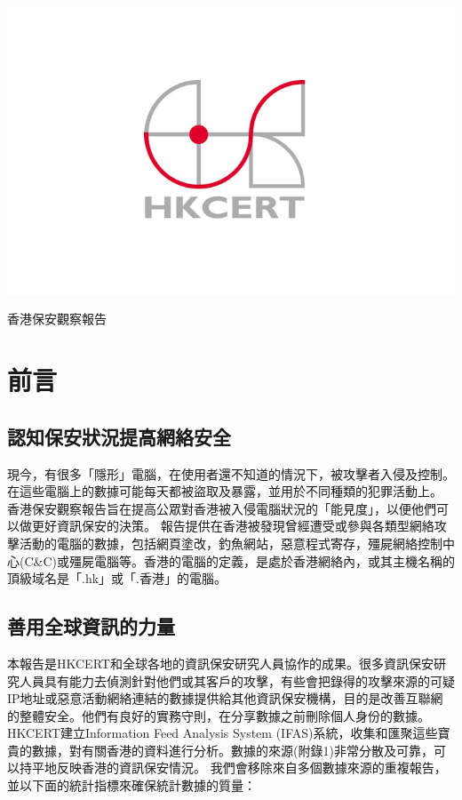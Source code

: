 \documentclass[14pt]{extarticle}
\begin{document}
\vspace{1cm}

\includegraphics{HKCERT}

\vspace{4cm}

\centerline{\Huge 香港保安觀察報告}

\vspace{2.5cm}

\centerline{\huge }
\newpage


\section*{前言}
\subsection*{認知保安狀況提高網絡安全}
現今，有很多「隱形」電腦，在使用者還不知道的情況下，被攻擊者入侵及控制。在這些電腦上的數據可能每天都被盜取及暴露，並用於不同種類的犯罪活動上。
香港保安觀察報告旨在提高公眾對香港被入侵電腦狀況的「能見度」，以便他們可以做更好資訊保安的決策。
報告提供在香港被發現曾經遭受或參與各類型網絡攻擊活動的電腦的數據，包括網頁塗改，釣魚網站，惡意程式寄存，殭屍網絡控制中心(C\&C)或殭屍電腦等。香港的電腦的定義，是處於香港網絡內，或其主機名稱的頂級域名是「.hk」或「.香港」的電腦。

\subsection*{善用全球資訊的力量}
本報告是HKCERT和全球各地的資訊保安研究人員協作的成果。很多資訊保安研究人員具有能力去偵測針對他們或其客戶的攻擊，有些會把錄得的攻擊來源的可疑IP地址或惡意活動網絡連結的數據提供給其他資訊保安機構，目的是改善互聯網的整體安全。他們有良好的實務守則，在分享數據之前刪除個人身份的數據。
HKCERT建立Information Feed Analysis System (IFAS)系統，收集和匯聚這些寶貴的數據，對有關香港的資料進行分析。數據的來源(附錄1)非常分散及可靠，可以持平地反映香港的資訊保安情況。
我們會移除來自多個數據來源的重複報告，並以下面的統計指標來確保統計數據的質量：
\end{document}
